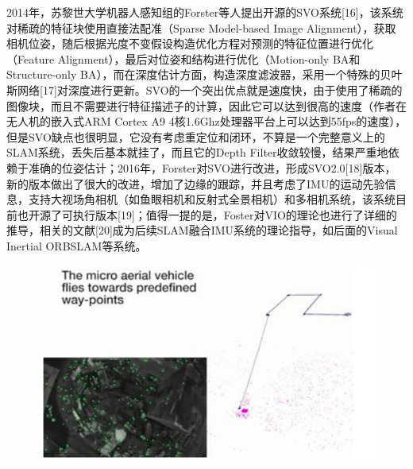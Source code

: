 2014年，苏黎世大学机器人感知组的Forster等人提出开源的SVO系统[16]，该系统对稀疏的特征块使用直接法配准（Sparse Model-based Image Alignment），获取相机位姿，随后根据光度不变假设构造优化方程对预测的特征位置进行优化（Feature Alignment），最后对位姿和结构进行优化（Motion-only BA和Structure-only BA），而在深度估计方面，构造深度滤波器，采用一个特殊的贝叶斯网络[17]对深度进行更新。SVO的一个突出优点就是速度快，由于使用了稀疏的图像块，而且不需要进行特征描述子的计算，因此它可以达到很高的速度（作者在无人机的嵌入式ARM Cortex A9 4核1.6Ghz处理器平台上可以达到55fps的速度），但是SVO缺点也很明显，它没有考虑重定位和闭环，不算是一个完整意义上的SLAM系统，丢失后基本就挂了，而且它的Depth Filter收敛较慢，结果严重地依赖于准确的位姿估计；2016年，Forster对SVO进行改进，形成SVO2.0[18]版本，新的版本做出了很大的改进，增加了边缘的跟踪，并且考虑了IMU的运动先验信息，支持大视场角相机（如鱼眼相机和反射式全景相机）和多相机系统，该系统目前也开源了可执行版本[19]；值得一提的是，Foster对VIO的理论也进行了详细的推导，相关的文献[20]成为后续SLAM融合IMU系统的理论指导，如后面的Visual Inertial ORBSLAM等系统。
\begin{figure}[H]%
	\centering  %
	\includegraphics[width=0.7\linewidth]{image/Talk/12.png}  %

\end{figure}


